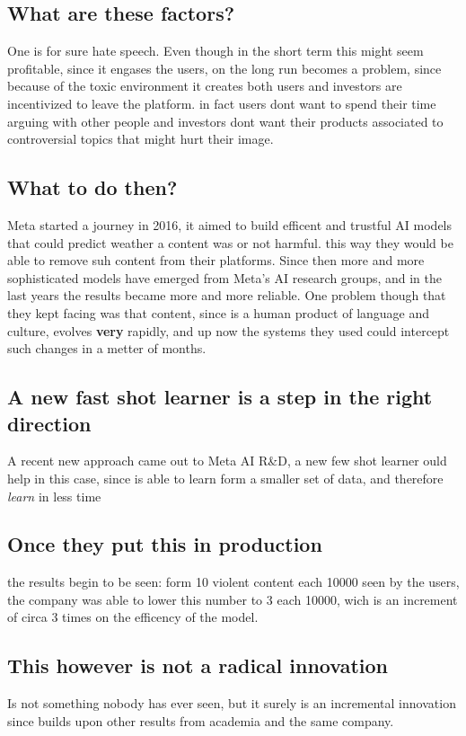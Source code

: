 \documentclass[11pt]{article}
\begin{document}
\subsection{What are these factors?}
\label{sec:org95319de}
One is for sure hate speech. Even though in the short term this
might seem profitable, since it engases the users, on the long run
becomes a problem, since because of the toxic environment it
creates both users and investors are incentivized to leave the
platform. in fact users dont want to spend their time arguing with
other people and investors dont want their products associated to
controversial topics that might hurt their image.
\subsection{What to do then?}
\label{sec:orgcb90810}
Meta started a journey in 2016, it aimed to build efficent and
trustful AI models that could predict weather a content was or not
harmful. this way they would be able to remove suh content from
their platforms. Since then more and more sophisticated models have
emerged from Meta's AI research groups, and in the last years the
results became more and more reliable. One problem though that they
kept facing was that content, since is a human product of language
and culture, evolves \textbf{very} rapidly, and up now the systems they
used could intercept such changes in a metter of months.
\subsection{A new fast shot learner is a step in the right direction}
\label{sec:org7e61483}
A recent new approach came out to Meta AI R\&D, a new few shot
learner ould help in this case, since is able to learn form a
smaller set of data, and therefore \emph{learn} in less time
\subsection{Once they put this in production}
\label{sec:orgaff0f19}
the results begin to be seen: form 10 violent content each 10000
seen by the users, the company was able to lower this number to 3
each 10000, wich is an increment of circa 3 times on the efficency
of the model.
\subsection{This however is not a radical innovation}
\label{sec:orgddd3cc1}
Is not something nobody has ever seen, but it surely is an
incremental innovation since builds upon other results from
academia and the same company.
\end{document}
